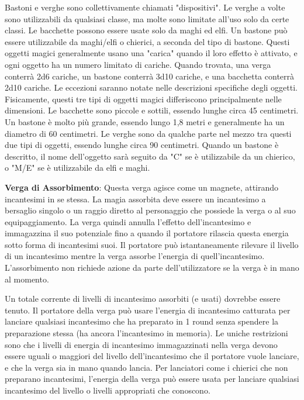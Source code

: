 \documentclass{article}
\begin{document}
\begin{multicols}{2}
Bastoni e verghe sono collettivamente chiamati "dispositivi". Le verghe a volte sono utilizzabili da qualsiasi classe, ma molte sono limitate all'uso solo da certe classi. Le bacchette possono essere usate solo da maghi ed elfi. Un bastone può essere utilizzabile da maghi/elfi o chierici, a seconda del tipo di bastone. Questi oggetti magici generalmente usano una "carica" quando il loro effetto è attivato, e ogni oggetto ha un numero limitato di cariche. Quando trovata, una verga conterrà 2d6 cariche, un bastone conterrà 3d10 cariche, e una bacchetta conterrà 2d10 cariche. Le eccezioni saranno notate nelle descrizioni specifiche degli oggetti. Fisicamente, questi tre tipi di oggetti magici differiscono principalmente nelle dimensioni. Le bacchette sono piccole e sottili, essendo lunghe circa 45 centimetri. Un bastone è molto più grande, essendo lungo 1,8 metri e generalmente ha un diametro di 60 centimetri. Le verghe sono da qualche parte nel mezzo tra questi due tipi di oggetti, essendo lunghe circa 90 centimetri. Quando un bastone è descritto, il nome dell'oggetto sarà seguito da "C" se è utilizzabile da un chierico, o "M/E" se è utilizzabile da elfi e maghi.

\textbf{Verga di Assorbimento}: Questa verga agisce come un magnete, attirando incantesimi in se stessa. La magia assorbita deve essere un incantesimo a bersaglio singolo o un raggio diretto al personaggio che possiede la verga o al suo equipaggiamento. La verga quindi annulla l'effetto dell'incantesimo e immagazzina il suo potenziale fino a quando il portatore rilascia questa energia sotto forma di incantesimi suoi. Il portatore può istantaneamente rilevare il livello di un incantesimo mentre la verga assorbe l'energia di quell'incantesimo. L'assorbimento non richiede azione da parte dell'utilizzatore se la verga è in mano al momento.

Un totale corrente di livelli di incantesimo assorbiti (e usati) dovrebbe essere tenuto. Il portatore della verga può usare l'energia di incantesimo catturata per lanciare qualsiasi incantesimo che ha preparato in 1 round senza spendere la preparazione stessa (ha ancora l'incantesimo in memoria). Le uniche restrizioni sono che i livelli di energia di incantesimo immagazzinati nella verga devono essere uguali o maggiori del livello dell'incantesimo che il portatore vuole lanciare, e che la verga sia in mano quando lancia. Per lanciatori come i chierici che non preparano incantesimi, l'energia della verga può essere usata per lanciare qualsiasi incantesimo del livello o livelli appropriati che conoscono.


\end{multicols}
\end{document}
